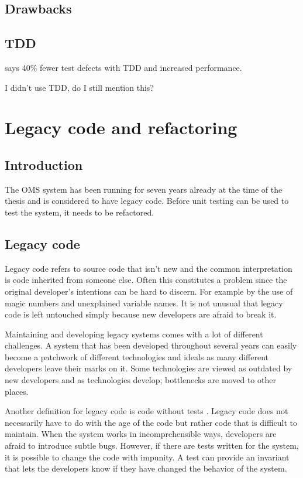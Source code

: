 \documentclass{article}
\begin{document}
		\subsection{Drawbacks}



		\subsection{TDD}
		\cite{unit} says 40\% fewer test defects with TDD and increased performance. 

		I didn't use TDD, do I still mention this?

	\section{Legacy code and refactoring}
		\subsection{Introduction}
		The OMS system has been running for seven years already at the time of the thesis and is considered to have legacy code. Before unit testing can be used to test the system, it needs to be refactored. 

		\subsection{Legacy code}
		Legacy code refers to source code that isn't new and the common interpretation is code inherited from someone else. Often this constitutes a problem since the original developer's intentions can be hard to discern. For example by the use of magic numbers and unexplained variable names. It is not unusual that legacy code is left untouched simply because new developers are afraid to break it.

		Maintaining and developing legacy systems comes with a lot of different challenges. A system that has been developed throughout several years can easily become a patchwork of different technologies and ideals as many different developers leave their marks on it. Some technologies are viewed as outdated by new developers and as technologies develop; bottlenecks are moved to other places.

		Another definition for legacy code is code without tests \cite{legacy}. Legacy code does not necessarily have to do with the age of the code but rather code that is difficult to maintain. When the system works in incomprehensible ways, developers are afraid to introduce subtle bugs. However, if there are tests written for the system, it is possible to change the code with impunity. A test can provide an invariant that lets the developers know if they have changed the behavior of the system.
\end{document}

